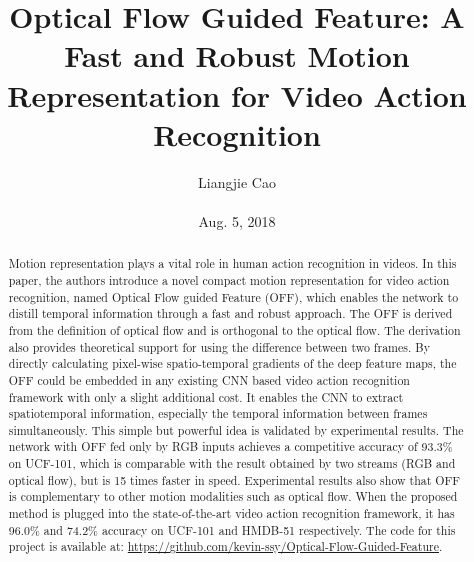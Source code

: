 \documentclass[10pt,twocolumn,letterpaper]{article}
\begin{document}
\title{\textbf{Optical Flow Guided Feature: A Fast and Robust Motion Representation for Video Action Recognition}}
\author{Liangjie Cao\\\\ Aug. 5, 2018}
\maketitle
\begin{abstract}
Motion representation plays a vital role in human action recognition in videos. In this paper, the authors introduce a novel
compact motion representation for video action recognition, named Optical Flow guided Feature (OFF), which enables the network to distill temporal information through a fast and robust approach. The OFF is derived from the definition of optical flow and is orthogonal to the optical
flow. The derivation also provides theoretical support for using the difference between two frames. By directly calculating pixel-wise spatio-temporal gradients of the deep feature maps, the OFF could be embedded in any existing CNN based video action recognition framework with only a
slight additional cost. It enables the CNN to extract spatiotemporal information, especially the temporal information
between frames simultaneously. This simple but powerful idea is validated by experimental results. The network with
OFF fed only by RGB inputs achieves a competitive accuracy of 93.3\% on UCF-101, which is comparable with the result obtained by two streams (RGB and optical flow), but is 15 times faster in speed. Experimental results also show that OFF is complementary to other motion modalities such as optical flow. When the proposed method is plugged into the state-of-the-art video action recognition framework, it has 96.0\% and 74.2\% accuracy on UCF-101 and HMDB-51 respectively. The code for this project is available at: \url{https://github.com/kevin-ssy/Optical-Flow-Guided-Feature}.
\end{abstract}
\end{document}
